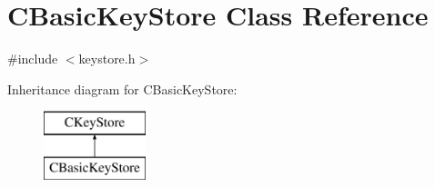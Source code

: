 \hypertarget{class_c_basic_key_store}{}\section{C\+Basic\+Key\+Store Class Reference}
\label{class_c_basic_key_store}


{\ttfamily \#include $<$keystore.\+h$>$}

Inheritance diagram for C\+Basic\+Key\+Store\+:\begin{figure}[H]
\begin{center}
\leavevmode
\includegraphics[height=2.000000cm]{class_c_basic_key_store}
\end{center}
\end{figure}
